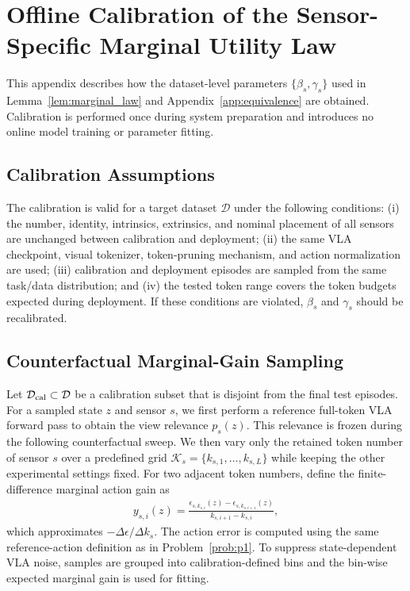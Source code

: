 \documentclass[lettersize,journal]{IEEEtran}
\theoremstyle{custom}
\begin{document}
\section{Offline Calibration of the Sensor-Specific Marginal Utility Law}\label{app:calibration}
This appendix describes how the dataset-level parameters $\{\beta_s,\gamma_s\}$ used in Lemma~\ref{lem:marginal_law} and Appendix~\ref{app:equivalence} are obtained. Calibration is performed once during system preparation and introduces no online model training or parameter fitting.

\subsection{Calibration Assumptions}
The calibration is valid for a target dataset $\mathcal D$ under the following conditions: (i) the number, identity, intrinsics, extrinsics, and nominal placement of all sensors are unchanged between calibration and deployment; (ii) the same VLA checkpoint, visual tokenizer, token-pruning mechanism, and action normalization are used; (iii) calibration and deployment episodes are sampled from the same task/data distribution; and (iv) the tested token range covers the token budgets expected during deployment. If these conditions are violated, $\beta_s$ and $\gamma_s$ should be recalibrated.

\subsection{Counterfactual Marginal-Gain Sampling}
Let $\mathcal D_{\rm cal}\subset\mathcal D$ be a calibration subset that is disjoint from the final test episodes. For a sampled state $z$ and sensor $s$, we first perform a reference full-token VLA forward pass to obtain the view relevance $p_s(z)$. This relevance is frozen during the following counterfactual sweep. We then vary only the retained token number of sensor $s$ over a predefined grid $\mathcal K_s=\{k_{s,1},\ldots,k_{s,L}\}$ while keeping the other experimental settings fixed. For two adjacent token numbers, define the finite-difference marginal action gain as
\begin{align}\label{eq:cal_marginal}
    y_{s,i}(z)
    =\frac{\epsilon_{s,k_{s,i}}(z)-\epsilon_{s,k_{s,i+1}}(z)}
    {k_{s,i+1}-k_{s,i}},
\end{align}
which approximates $-\Delta\epsilon/\Delta k_s$. The action error is computed using the same reference-action definition as in Problem~\ref{prob:p1}. To suppress state-dependent VLA noise, samples are grouped into calibration-defined bins and the bin-wise expected marginal gain is used for fitting.
\end{document}
